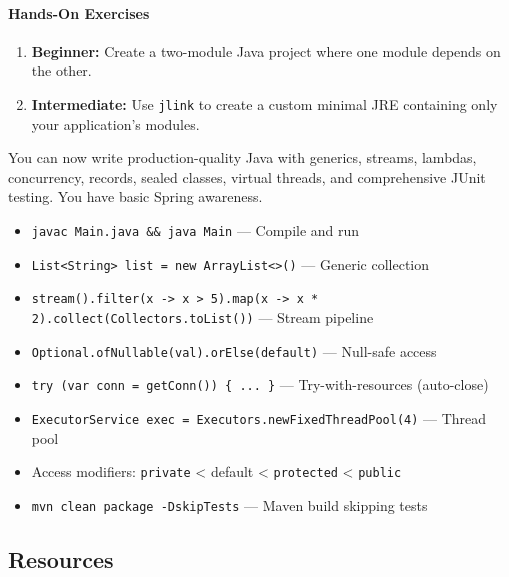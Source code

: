 \documentclass[11pt, a4paper, oneside]{report}
\begin{document}
\paragraph{Hands-On Exercises}
\begin{enumerate}[leftmargin=*]
\item \textbf{Beginner:} Create a two-module Java project where one module depends on the other.
\item \textbf{Intermediate:} Use \texttt{jlink} to create a custom minimal JRE containing only your application's modules.
\end{enumerate}

\begin{microcheckpoint}
You can now write production-quality Java with generics, streams, lambdas, concurrency, records, sealed classes, virtual threads, and comprehensive JUnit testing. You have basic Spring awareness.
\end{microcheckpoint}

\begin{cheatsheetbox}
\begin{itemize}[leftmargin=*]
\item \texttt{javac Main.java \&\& java Main} --- Compile and run
\item \texttt{List<String> list = new ArrayList<>()} --- Generic collection
\item \texttt{stream().filter(x -> x > 5).map(x -> x * 2).collect(Collectors.toList())} --- Stream pipeline
\item \texttt{Optional.ofNullable(val).orElse(default)} --- Null-safe access
\item \texttt{try (var conn = getConn()) \{ ... \}} --- Try-with-resources (auto-close)
\item \texttt{ExecutorService exec = Executors.newFixedThreadPool(4)} --- Thread pool
\item Access modifiers: \texttt{private} < default < \texttt{protected} < \texttt{public}
\item \texttt{mvn clean package -DskipTests} --- Maven build skipping tests
\end{itemize}
\end{cheatsheetbox}

\subsection*{Resources}
\end{document}
